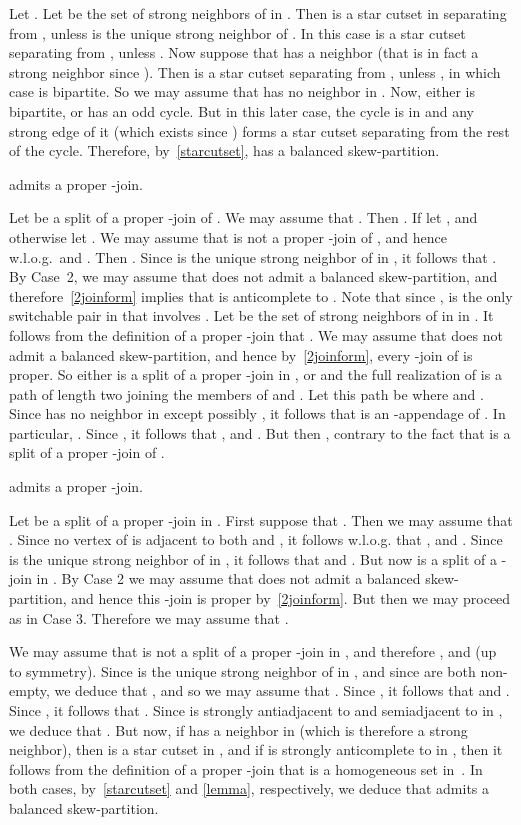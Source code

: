 \documentclass[11 pt] {article}
\newcommand\blackslug{\hbox{\hskip 1pt \vrule width 4pt height 8pt depth 1.5pt
        \hskip 1pt}}
\newcommand\bbox{\hfill \quad \blackslug \medbreak}
\begin{document}
Let . Let  be the set of strong neighbors of  in
. Then  is a star cutset in 
separating  from , unless  is the unique strong neighbor of
. In this case  is a star cutset separating  from
, unless . Now suppose that  has a
neighbor  (that is in fact a strong neighbor since ). Then  is a star cutset separating  from , unless , in which case  is
bipartite. So we may assume that  has no neighbor in .  Now,
either  is bipartite, or  has an odd cycle. But in this later
case, the cycle is in  and any strong edge of it (which exists
since ) forms a star cutset separating  from the
rest of the cycle.  Therefore, by~\ref{starcutset},  has a balanced
skew-partition.

  admits a proper -join.

Let  be a split of a proper -join of
. We may assume that . Then . If  let , and otherwise let . We may assume that
 is not a proper -join of , and
hence w.l.o.g.\  and . Then . Since  is the unique strong neighbor of  in , it
follows that . By Case~2, we may assume that  does not
admit a balanced skew-partition, and therefore~\ref{2joinform} implies
that  is anticomplete to .  Note that since ,
 is the only switchable pair in  that involves .  Let  be
the set of strong neighbors of  in  in . It follows from
the definition of a proper -join that .  We may
assume that  does not admit a balanced skew-partition, and hence
by~\ref{2joinform}, every -join of  is proper.  So either  is a split of a proper
-join in , or  and the full realization of  is a path of length two joining the members of  and
. Let this path be  where  and . Since  has no neighbor in  except possibly ,
it follows that  is an -appendage of . In particular, . Since , it follows that
,  and . But then ,
contrary to the fact that  is a split of a
proper -join of .

  admits a proper -join.

Let  be a split of a proper -join in
. First suppose that . Then we may
assume that . Since no vertex of  is
adjacent to both  and , it follows w.l.o.g. that ,  and .  Since  is the unique strong neighbor
of  in , it follows that  and .  But
now  is a split of a
-join in . By Case 2 we may assume that  does not admit a
balanced skew-partition, and hence this -join is proper
by~\ref{2joinform}. But then we may proceed as in Case 3.  Therefore
we may assume that .

We may assume that  is
not a split of a proper -join in , and therefore , and  (up to
symmetry). Since  is the unique strong neighbor of  in , and
since  are both non-empty, we deduce that ,
and so we may assume that . Since , it
follows that  and .  Since , it follows that .  Since  is strongly
antiadjacent to  and semiadjacent to  in , we deduce that . But now, if  has a neighbor  in  (which is therefore a
strong neighbor), then  is a star cutset
in , and if  is strongly anticomplete to  in , then it follows
from the definition of a proper -join that  is a 
homogeneous set in~. In both cases, by~\ref{starcutset} and
\ref{lemma}, respectively, we deduce that  admits a balanced
skew-partition.
\bbox
\end{document}
